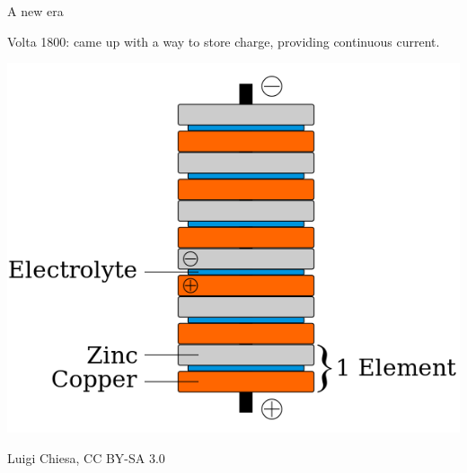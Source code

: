 \begin{frame}{A new era }
\small

Volta 1800: came up with a way to store charge, providing continuous current. %


\begin{center}
\includegraphics[scale=0.3]{voltaic-pile}
\end{center}
\tiny
 Luigi Chiesa, CC BY-SA 3.0 
\end{frame}





